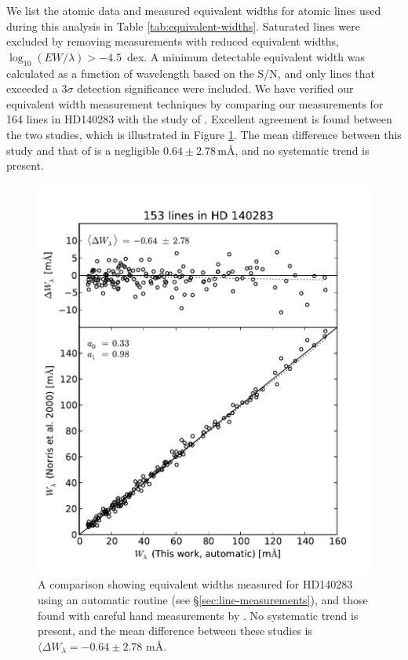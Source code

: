 \documentclass{emulateapj}
\begin{document}
We list the atomic data and measured equivalent widths for atomic lines used during this analysis in Table \ref{tab:equivalent-widths}. Saturated lines were excluded by removing measurements with reduced equivalent widths, $\log_{10}{(EW/\lambda)} > -4.5$\, dex. A minimum detectable equivalent width was calculated as a function of wavelength based on the S/N, and only lines that exceeded a $3\sigma$ detection significance were included. We have verified our equivalent width measurement techniques by comparing our measurements for 164 lines in HD140283 with the study of \citet{Norris;et-al_1996}. Excellent agreement is found between the two studies, which is illustrated in Figure \ref{fig:ew-compare}. The mean difference between this study and that of \cite{norris;et-al_1996} is a negligible $0.64 \pm 2.78$\,m\AA{}, and no systematic trend is present.

\begin{figure}[h]
	\includegraphics[width=\columnwidth]{./figures/smh-norris.pdf}
	\caption{A comparison showing equivalent widths measured for HD140283 using an automatic routine (see \S\ref{sec:line-measurements}), and those found with careful hand measurements by \citet{norris;et-al_1996}. No systematic trend is present, and the mean difference between these studies is $\langle\Delta{}W_\lambda = -0.64 \pm 2.78$ m\AA{}.}
	\label{fig:ew-compare}
\end{figure}
\end{document}
